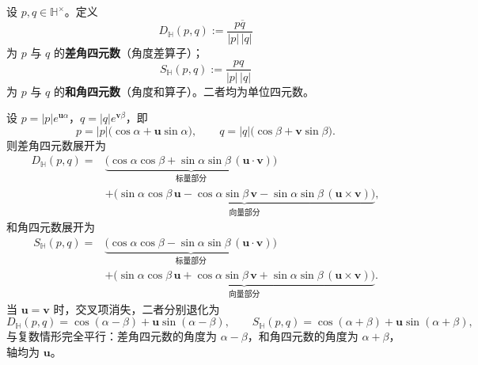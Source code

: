 \begin{definition}[差角四元数与和角四元数]\label{def:quaternion_diff_sum}
设 $p,q\in\mathbb H^\times$。定义
\[
\boxed{
D_{\mathbb H}(p,q):=\frac{p\overline q}{|p|\,|q|}
}
\]
为 $p$ 与 $q$ 的\textbf{差角四元数}（角度差算子）；
\[
\boxed{
S_{\mathbb H}(p,q):=\frac{pq}{|p|\,|q|}
}
\]
为 $p$ 与 $q$ 的\textbf{和角四元数}（角度和算子）。二者均为单位四元数。
\end{definition}

\begin{lemma}[差角四元数与和角四元数的实虚分解]\label{lem:quaternion_diff_sum_decomposition}
设 $p=|p|e^{\mathbf u\alpha}$，$q=|q|e^{\mathbf v\beta}$，即
\[
p=|p|\bigl(\cos\alpha+\mathbf u\sin\alpha\bigr),\qquad
q=|q|\bigl(\cos\beta+\mathbf v\sin\beta\bigr).
\]
则差角四元数展开为
\[
\begin{aligned}
D_{\mathbb H}(p,q)
={}& \underbrace{\bigl(\cos\alpha\cos\beta+\sin\alpha\sin\beta\,(\mathbf u\cdot\mathbf v)\bigr)}_{\text{标量部分}} \\
&+ \underbrace{\bigl(\sin\alpha\cos\beta\,\mathbf u-\cos\alpha\sin\beta\,\mathbf v
   -\sin\alpha\sin\beta\,(\mathbf u\times\mathbf v)\bigr)}_{\text{向量部分}},
\end{aligned}
\]
和角四元数展开为
\[
\begin{aligned}
S_{\mathbb H}(p,q)
={}& \underbrace{\bigl(\cos\alpha\cos\beta-\sin\alpha\sin\beta\,(\mathbf u\cdot\mathbf v)\bigr)}_{\text{标量部分}} \\
&+ \underbrace{\bigl(\sin\alpha\cos\beta\,\mathbf u+\cos\alpha\sin\beta\,\mathbf v
   +\sin\alpha\sin\beta\,(\mathbf u\times\mathbf v)\bigr)}_{\text{向量部分}}.
\end{aligned}
\]
当 $\mathbf u=\mathbf v$ 时，交叉项消失，二者分别退化为
\[
D_{\mathbb H}(p,q)=\cos(\alpha-\beta)+\mathbf u\sin(\alpha-\beta),\qquad
S_{\mathbb H}(p,q)=\cos(\alpha+\beta)+\mathbf u\sin(\alpha+\beta),
\]
与复数情形完全平行：差角四元数的角度为 $\alpha-\beta$，和角四元数的角度为 $\alpha+\beta$，轴均为 $\mathbf u$。
\end{lemma}

